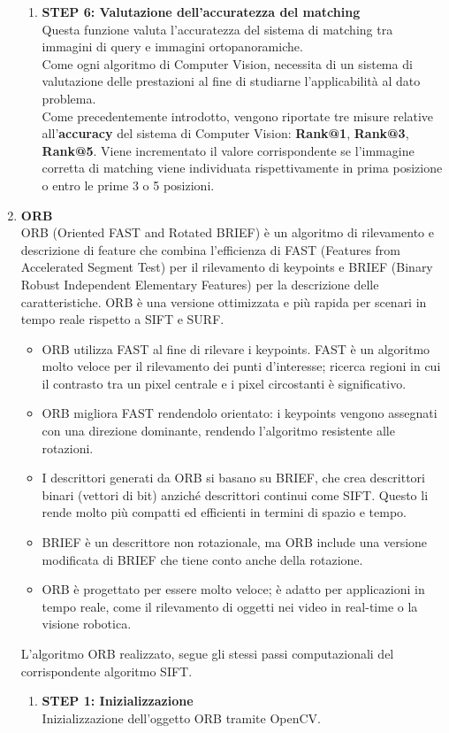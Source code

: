 \documentclass[12pt,a4paper,openright,twoside]{book}
\begin{document}
\begin{enumerate}
\begin{enumerate}
\item \textbf{STEP 6: Valutazione dell'accuratezza del matching}\\
Questa funzione valuta l'accuratezza del sistema di matching tra immagini di query e immagini ortopanoramiche.\\
Come ogni algoritmo di Computer Vision, necessita di un sistema di valutazione delle prestazioni al fine di studiarne l'applicabilità al dato problema.\\
Come precedentemente introdotto, vengono riportate tre misure relative all'\textbf{accuracy} del sistema di Computer Vision: \textbf{Rank@1},  \textbf{Rank@3},  \textbf{Rank@5}. Viene incrementato il valore corrispondente se l'immagine corretta di matching viene individuata rispettivamente in prima posizione o entro le prime 3 o 5 posizioni.

\end{enumerate}
\item \textbf{ORB}\\
ORB (Oriented FAST and Rotated BRIEF) è un algoritmo di rilevamento e descrizione di feature che combina l'efficienza di FAST (Features from Accelerated Segment Test) per il rilevamento di keypoints e BRIEF (Binary Robust Independent Elementary Features) per la descrizione delle caratteristiche. ORB è una versione ottimizzata e più rapida per scenari in tempo reale rispetto a SIFT e SURF.
\begin{itemize}
\item ORB utilizza FAST al fine di rilevare i keypoints. FAST è un algoritmo molto veloce per il rilevamento dei punti d'interesse; ricerca regioni in cui il contrasto tra un pixel centrale e i pixel circostanti è significativo.
\item ORB migliora FAST rendendolo orientato: i keypoints vengono assegnati con una direzione dominante, rendendo l'algoritmo resistente alle rotazioni.
\item I descrittori generati da ORB si basano su BRIEF, che crea descrittori binari (vettori di bit) anziché descrittori continui come SIFT. Questo li rende molto più compatti ed efficienti in termini di spazio e tempo.
\item BRIEF è un descrittore non rotazionale, ma ORB include una versione modificata di BRIEF che tiene conto anche della rotazione.
\item ORB è progettato per essere molto veloce; è adatto per applicazioni in tempo reale, come il rilevamento di oggetti nei video in real-time o la visione robotica.
\end{itemize}
L'algoritmo ORB realizzato, segue gli stessi passi computazionali del corrispondente algoritmo SIFT.
\begin{enumerate}
\item \textbf{STEP 1: Inizializzazione}\\
Inizializzazione dell'oggetto ORB tramite OpenCV. \\


\end{enumerate}
\end{enumerate}
\end{document}
